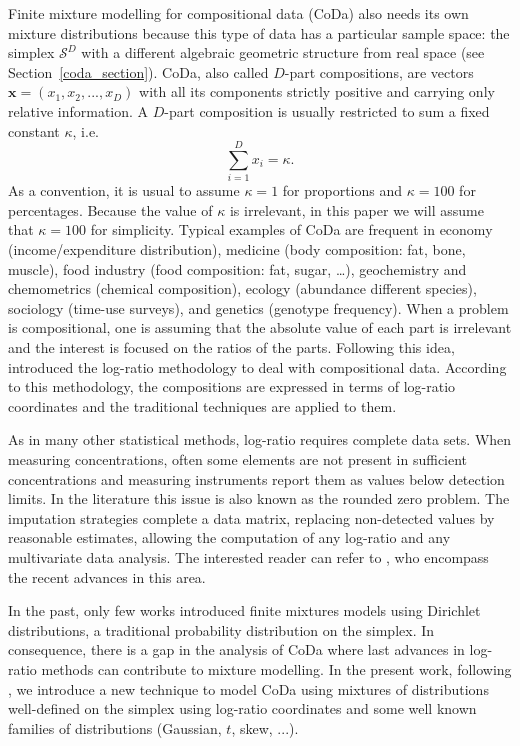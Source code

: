 \documentclass[12pt, a4paper]{article}
\begin{document}
Finite mixture modelling for compositional data (CoDa) also needs its own mixture distributions because this type of data has a particular sample space: the simplex $\mathcal{S}^D$ with a different algebraic geometric structure from real space (see Section~\ref{coda_section}).
CoDa, also called $D$-part compositions, are vectors $\textbf{x} = (x_1, x_2, ..., x_D)$ with all its components strictly positive  and carrying only relative information. A $D$-part composition is usually restricted to sum a fixed constant $\kappa$, i.e.
\begin{equation}
\sum_{i=1 }^D x_i = \kappa.
\label{sum_to_constant}
\end{equation}
As a convention, it is usual to assume $\kappa =1$ for proportions and $\kappa = 100$ for percentages. Because the value of $\kappa$ is irrelevant, in this paper we will assume that $\kappa = 100$ for simplicity. Typical examples of CoDa are frequent in economy (income/expenditure distribution), medicine (body composition: fat, bone, muscle), food industry (food composition: fat, sugar, …), geochemistry and chemometrics (chemical composition), ecology (abundance different species), sociology (time-use surveys), and genetics (genotype frequency). 
When a problem is compositional, one is assuming that the absolute value of each part is irrelevant and the interest is focused on the ratios of the parts. Following this idea, \cite{aitchison1986statistical} introduced the log-ratio methodology to deal with compositional data. According to this methodology, the compositions are expressed in terms of log-ratio coordinates and the traditional techniques are applied to them.

As in many other statistical methods, log-ratio requires complete data sets. When measuring concentrations, often some elements are not present in sufficient concentrations and measuring instruments report them as values below detection limits. In the literature this issue is also known as the rounded zero problem. The imputation strategies complete a data matrix, replacing non-detected values by reasonable estimates, allowing the computation of any log-ratio and any multivariate data analysis. The interested reader can refer to \cite{palarea2014compositional}, who encompass the recent advances in this area.


In the past, only few works \citep[e.g.,][]{albert1982mixtures, bouguila2004unsupervised} introduced finite mixtures models using Dirichlet distributions, a traditional probability distribution on the simplex. In consequence, there is a gap in the analysis of CoDa where last advances in log-ratio methods can contribute to mixture modelling. In the present work, following \cite{mateu2013normal}, we introduce a new technique to model CoDa using mixtures of distributions well-defined on the simplex using log-ratio coordinates and some well known families of distributions (Gaussian, $t$, skew, ...).
\end{document}
